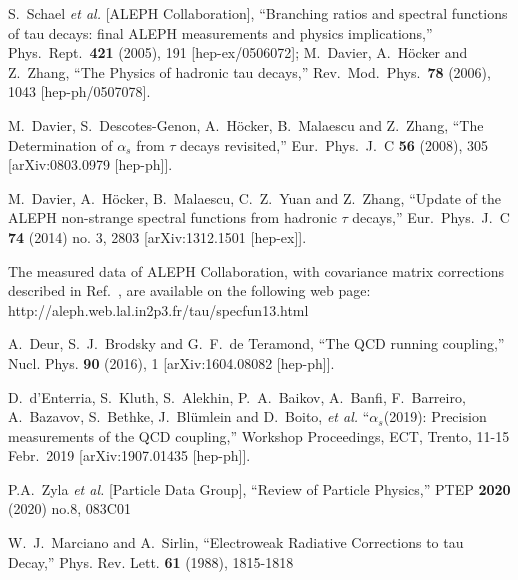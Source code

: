 \documentclass[aps,nofootinbib,showkeys,noshowpacs,preprintnumbers,amsmath,amssymb]{revtex4}
\begin{document}
\begin{thebibliography}{99}

  S.~Schael {\it et al.}  [ALEPH Collaboration],
``Branching ratios and spectral functions of tau decays: final ALEPH measurements and physics implications,''
Phys.\ Rept.\  {\bf 421} (2005), 191
  [hep-ex/0506072];
  M.~Davier, A.~H\"ocker and Z.~Zhang,
  ``The Physics of hadronic tau decays,''
 Rev.\ Mod.\ Phys.\  {\bf 78} (2006), 1043
  [hep-ph/0507078].
  
  M.~Davier, S.~Descotes-Genon, A.~H\"ocker, B.~Malaescu and Z.~Zhang,
  ``The Determination of $\alpha_s$ from $\tau$ decays revisited,''
 Eur.\ Phys.\ J.\ C {\bf 56} (2008), 305
  [arXiv:0803.0979 [hep-ph]].
  
  M.~Davier, A.~H\"ocker, B.~Malaescu, C.~Z.~Yuan and Z.~Zhang,
  ``Update of the ALEPH non-strange spectral functions from hadronic $\tau$ decays,''
  Eur.\ Phys.\ J.\ C {\bf 74} (2014) no. 3, 2803
  [arXiv:1312.1501 [hep-ex]].

  The measured data of ALEPH Collaboration, with covariance matrix corrections described in Ref.~\cite{ALEPHfin}, are available on the following web page:
http://aleph.web.lal.in2p3.fr/tau/specfun13.html

A.~Deur, S.~J.~Brodsky and G.~F.~de Teramond,
``The QCD running coupling,''
Nucl. Phys. \textbf{90} (2016), 1
[arXiv:1604.08082 [hep-ph]].

D.~d'Enterria, S.~Kluth, S.~Alekhin, P.~A.~Baikov, A.~Banfi, F.~Barreiro, A.~Bazavov, S.~Bethke, J.~Bl\"umlein and D.~Boito, \textit{et al.}
``$\alpha_s$(2019): Precision measurements of the QCD coupling,''
Workshop Proceedings, ECT, Trento, 11-15 Febr.~2019
[arXiv:1907.01435 [hep-ph]].

P.A.~Zyla \textit{et al.} [Particle Data Group],
``Review of Particle Physics,''
PTEP \textbf{2020} (2020) no.8, 083C01

W.~J.~Marciano and A.~Sirlin,
``Electroweak Radiative Corrections to tau Decay,''
Phys. Rev. Lett. \textbf{61} (1988), 1815-1818


\end{thebibliography}
\end{document}
